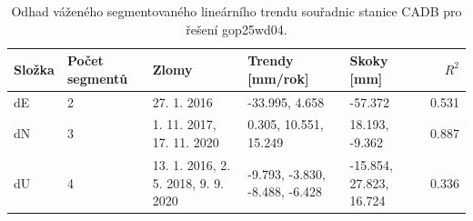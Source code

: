 \begin{table}[htbp]
\caption{Odhad váženého segmentovaného lineárního trendu souřadnic stanice CADB pro řešení gop25wd04.}
\label{tab:gop25wd04_stcd_cadb_weighted_multiseg}
\begin{tabular}{lllllr}
\toprule
Složka & Počet segmentů & Zlomy & Trendy [mm/rok] & Skoky [mm] & $R^2$ \\
\midrule
dE & 2 & 27. 1. 2016 & -33.995, 4.658 & -57.372 & 0.531 \\
dN & 3 & 1. 11. 2017, 17. 11. 2020 & 0.305, 10.551, 15.249 & 18.193, -9.362 & 0.887 \\
dU & 4 & 13. 1. 2016, 2. 5. 2018, 9. 9. 2020 & -9.793, -3.830, -8.488, -6.428 & -15.854, 27.823, 16.724 & 0.336 \\
\bottomrule
\end{tabular}
\end{table}
